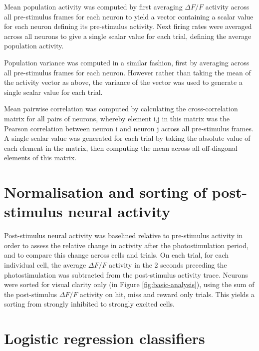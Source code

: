 Mean population activity was computed by first averaging $\Delta F/F$ activity across all pre-stimulus frames for each neuron to yield a vector containing a scalar value for each neuron defining its pre-stimulus activity. Next firing rates were averaged across all neurons to give a single scalar value for each trial, defining the average population activity. 

Population variance was computed in a similar fashion, first by averaging across all pre-stimulus frames for each neuron. However rather than taking the mean of the activity vector as above, the variance of the vector was used to generate a single scalar value for each trial.

Mean pairwise correlation was computed by calculating the cross-correlation matrix for all pairs of neurons, whereby element i,j in this matrix was the Pearson correlation between neuron i and neuron j across all pre-stimulus frames. A single scalar value was generated for each trial by taking the absolute value of each element in the matrix, then computing the mean across all off-diagonal elements of this matrix.


\section{Normalisation and sorting of post-stimulus neural activity}

Post-stimulus neural activity was baselined relative to pre-stimulus activity in order to assess the relative change in activity after the photostimulation period, and to compare this change across cells and trials. On each trial, for each individual cell, the average $\Delta F/F$ activity in the 2 seconds preceding the photostimulation was subtracted from the post-stimulus activity trace. Neurons were sorted for visual clarity only (in Figure \ref{fig:basic-analysis}), using the sum of the post-stimulus $\Delta F/F$ activity on hit, miss and reward only trials. This yields a sorting from strongly inhibited to strongly excited cells. 


\section{Logistic regression classifiers}

